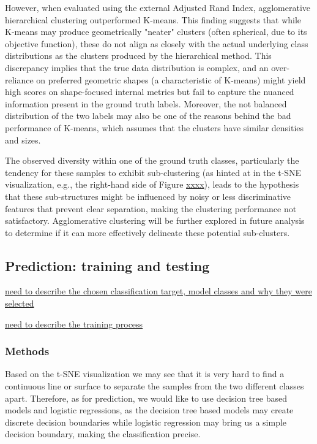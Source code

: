 \documentclass{article}
\begin{document}
However, when evaluated using the external Adjusted Rand Index, agglomerative hierarchical clustering outperformed K-means. This finding suggests that while K-means may produce geometrically "neater" clusters (often spherical, due to its objective function), these do not align as closely with the actual underlying class distributions as the clusters produced by the hierarchical method. This discrepancy implies that the true data distribution is complex, and an over-reliance on preferred geometric shapes (a characteristic of K-means) might yield high scores on shape-focused internal metrics but fail to capture the nuanced information present in the ground truth labels. Moreover, the not balanced distribution of the two labels may also be one of the reasons behind the bad performance of K-means, which assumes that the clusters have similar densities and sizes.

The observed diversity within one of the ground truth classes, particularly the tendency for these samples to exhibit sub-clustering (as hinted at in the t-SNE visualization, e.g., the right-hand side of Figure \underline{xxxx}), leads to the hypothesis that these sub-structures might be influenced by noisy or less discriminative features that prevent clear separation, making the clustering performance not satisfactory. Agglomerative clustering will be further explored in future analysis to determine if it can more effectively delineate these potential sub-clusters.

\subsection{Prediction: training and testing}

\underline{need to describe the chosen classification target, model classes and why they were selected}

\underline{need to describe the training process}


\subsubsection*{Methods}

Based on the t-SNE visualization we may see that it is very hard to find a continuous line or surface to separate the samples from the two different classes apart. 
Therefore, as for prediction, we would like to use decision tree based models and logistic regressions, as the decision tree based models may create discrete decision boundaries while logistic regression may bring us a simple decision boundary, making the classification precise.
\end{document}
